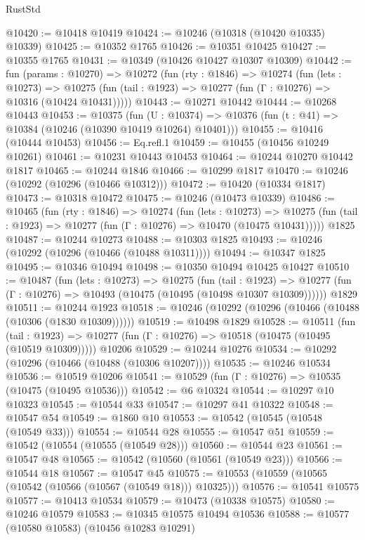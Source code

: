 \begin{lexlean}{RustStd}
\begin{coremodule}
{\begin{coremodule}
{{{{{@10420 := @10418 @10419
@10424 := @10246 (@10318 (@10420 @10335) @10339)
@10425 := @10352 @1765
@10426 := @10351 @10425
@10427 := @10355 @1765
@10431 := @10349 (@10426 @10427 @10307 @10309)
@10442 := fun (params : @10270) =>
  @10272
    (fun (rty : @1846) =>
    @10274
      (fun (lets : @10273) =>
      @10275 (fun (tail : @1923) => @10277 (fun (Γ : @10276) => @10316 (@10424 @10431)))))
@10443 := @10271 @10442
@10444 := @10268 @10443
@10453 := @10375
    (fun (U : @10374) => @10376 (fun (t : @41) => @10384 (@10246 (@10390 @10419 @10264) @10401)))
@10455 := @10416 (@10444 @10453)
@10456 := Eq.refl.{1}
@10459 := @10455 (@10456 @10249 @10261)
@10461 := @10231 @10443 @10453
@10464 := @10244 @10270 @10442 @1817
@10465 := @10244 @1846
@10466 := @10299 @1817
@10470 := @10246 (@10292 (@10296 (@10466 @10312)))
@10472 := @10420 (@10334 @1817)
@10473 := @10318 @10472
@10475 := @10246 (@10473 @10339)
@10486 := @10465
    (fun (rty : @1846) =>
    @10274
      (fun (lets : @10273) =>
      @10275 (fun (tail : @1923) => @10277 (fun (Γ : @10276) => @10470 (@10475 @10431)))))
    @1825
@10487 := @10244 @10273
@10488 := @10303 @1825
@10493 := @10246 (@10292 (@10296 (@10466 (@10488 @10311))))
@10494 := @10347 @1825
@10495 := @10346 @10494
@10498 := @10350 @10494 @10425 @10427
@10510 := @10487
    (fun (lets : @10273) =>
    @10275
      (fun (tail : @1923) =>
      @10277 (fun (Γ : @10276) => @10493 (@10475 (@10495 (@10498 @10307 @10309))))))
    @1829
@10511 := @10244 @1923
@10518 := @10246 (@10292 (@10296 (@10466 (@10488 (@10306 (@1830 @10309))))))
@10519 := @10498 @1829
@10528 := @10511
    (fun (tail : @1923) => @10277 (fun (Γ : @10276) => @10518 (@10475 (@10495 (@10519 @10309)))))
    @10206
@10529 := @10244 @10276
@10534 := @10292 (@10296 (@10466 (@10488 (@10306 @10207))))
@10535 := @10246 @10534
@10536 := @10519 @10206
@10541 := @10529 (fun (Γ : @10276) => @10535 (@10475 (@10495 @10536)))
@10542 := @6 @10324
@10544 := @10297 @10 @10323
@10545 := @10544 @33
@10547 := @10297 @41 @10322
@10548 := @10547 @54
@10549 := @1860 @10
@10553 := @10542 (@10545 (@10548 (@10549 @33)))
@10554 := @10544 @28
@10555 := @10547 @51
@10559 := @10542 (@10554 (@10555 (@10549 @28)))
@10560 := @10544 @23
@10561 := @10547 @48
@10565 := @10542 (@10560 (@10561 (@10549 @23)))
@10566 := @10544 @18
@10567 := @10547 @45
@10575 := @10553 (@10559 (@10565 (@10542 (@10566 (@10567 (@10549 @18))) @10325)))
@10576 := @10541 @10575
@10577 := @10413 @10534
@10579 := @10473 (@10338 @10575)
@10580 := @10246 @10579
@10583 := @10345 @10575 @10494 @10536
@10588 := @10577 (@10580 @10583) (@10456 @10283 @10291)
}}}}}
\end{coremodule}}
\end{coremodule}
\end{lexlean}
